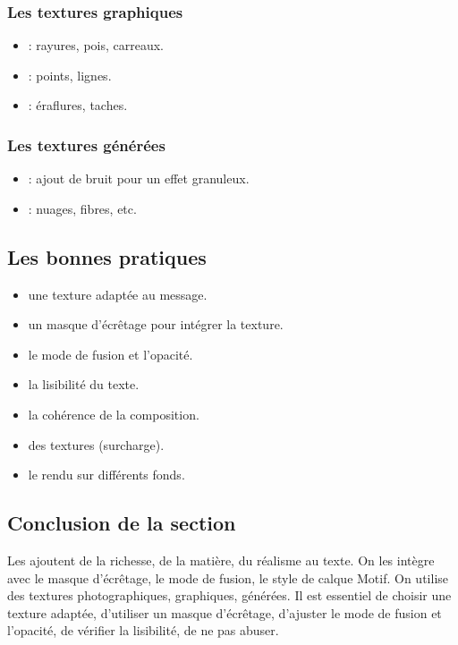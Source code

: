 \subsubsection{Les textures graphiques}

\begin{itemize}
    \item {} : rayures, pois, carreaux.
    \item {} : points, lignes.
    \item {} : éraflures, taches.
\end{itemize}

\subsubsection{Les textures générées}

\begin{itemize}
    \item {} : ajout de bruit pour un effet granuleux.
    \item {} : nuages, fibres, etc.
\end{itemize}

\subsection{Les bonnes pratiques}

\begin{itemize}
    \item {} une texture adaptée au message.
    \item {} un masque d'écrêtage pour intégrer la texture.
    \item {} le mode de fusion et l'opacité.
    \item {} la lisibilité du texte.
    \item {} la cohérence de la composition.
    \item {} des textures (surcharge).
    \item {} le rendu sur différents fonds.
\end{itemize}

\subsection*{Conclusion de la section}

Les  ajoutent de la richesse, de la matière, du réalisme au texte. On les intègre avec le masque d'écrêtage, le mode de fusion, le style de calque Motif. On utilise des textures photographiques, graphiques, générées. Il est essentiel de choisir une texture adaptée, d'utiliser un masque d'écrêtage, d'ajuster le mode de fusion et l'opacité, de vérifier la lisibilité, de ne pas abuser.

